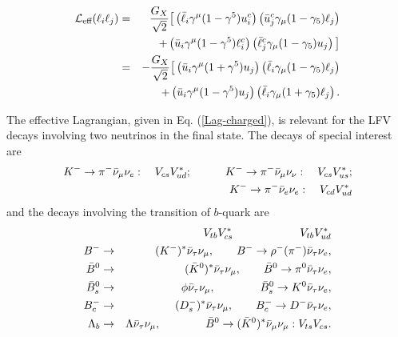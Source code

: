 \documentclass{ws-ijmpa}
\begin{document}
\begin{eqnarray}
\mathcal{L}_{\text{eff}}(\ell_{i}\ell_{j}) &=&  \frac{G_X}{\sqrt{2}}\big[\left(\bar{\ell}_{i}\gamma^{\mu}(1-\gamma^5)u^{c}_i\right)\left(\bar{u}^{c}_{j}\gamma_{\mu}(1-\gamma_5)\ell_{j}\right)\notag\\
&&+\left( \bar{u}_{i}\gamma^{\mu}(1-\gamma^5)\ell^{c}_i\right)\left(\bar{\ell}^{c}_{j}\gamma_{\mu}(1-\gamma_5)u_{j}\right)\big]\notag \\
& = & -\frac{G_X}{\sqrt{2}}\big[\left(\bar{u}_{i}\gamma^{\mu}(1+\gamma^5)u_{j}\right)\left(\bar{\ell}_{i}\gamma_{\mu}(1-\gamma_{5})\ell_{j}\right)\notag\\
&&+\left(\bar{u}_{i}\gamma^{\mu}(1-\gamma^5)u_{j}\right)\left(\bar{\ell}_{i}\gamma_{\mu}(1+\gamma_{5})\ell_{j}\right) \label{ll-Lag}.
\end{eqnarray}

The effective Lagrangian, given in Eq. (\ref{Lag-charged}), is relevant for the LFV decays involving two neutrinos in the final state. The decays of special interest are
\begin{eqnarray}
K^{-} \to \pi^{-}\bar{\nu}_{\mu}\nu_{e}: \quad V_{cs}V^{*}_{ud}; \quad\quad\quad K^{-} \to \pi^{-}\bar{\nu}_{\mu}\nu_{\nu}: \quad V_{cs}V^{*}_{us};\notag\\
\quad\quad K^{-} \to \pi^{-}\bar{\nu}_{e}\nu_{e}: \quad V_{cd}V^{*}_{ud} \label{kpidecays}
\end{eqnarray}
and the decays involving the transition of $b$-quark are
\begin{eqnarray}
&& V_{tb}V^{*}_{cs} \quad\quad\quad\quad\quad\quad V_{tb}V^{*}_{ud} \notag  \\
B^{-} &\to & (K^{-})^{*}\bar{\nu}_{\tau}\nu_\mu , \quad \quad B^{-} \to \rho^{-}(\pi^{-})\bar{\nu}_{\tau}\nu_{e} \notag ,\\
\bar{B}^{0} &\to & (\bar{K}^{0})^{*}\bar{\nu}_{\tau}\nu_\mu  , \quad \quad \bar{B}^{0}\to \pi^{0}\bar{\nu}_{\tau}\nu_e \notag ,\\
\bar{B}_{s}^{0} &\to &\phi \bar{\nu}_{\tau}\nu_\mu  , \quad \quad \quad \quad \bar{B}_{s}^{0}  \to  K^{0}\bar{\nu}_{\tau}\nu_e \notag ,\\
B_{c}^{-} &\to & (D_{s}^{-})^{*}\bar{\nu}_{\tau}\nu_\mu  , \quad \quad B_{c}^{-} \to  D^{-}\bar{\nu}_{\tau}\nu_e \notag,\\
\Lambda_{b} & \to & \Lambda \bar{\nu}_{\tau}\nu_\mu , \quad\quad\quad\quad \bar{B}^{0} \to (\bar{K}^{0})^{*}\bar{\nu}_{\mu}\nu_\mu: V_{ts}V_{cs} \label{38}.
\end{eqnarray}
\end{document}
